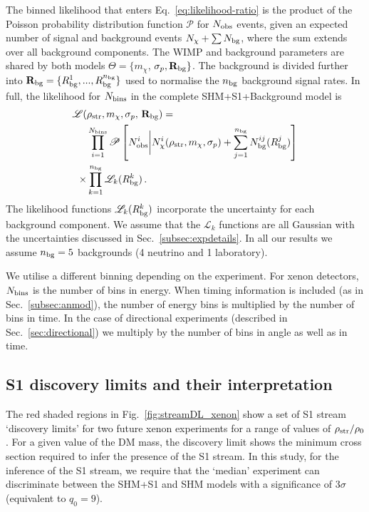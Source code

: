 \documentclass[prd,10pt,twocolumn,showpacs,nofootinbib,aps,superscriptaddress,preprintnumbers]{revtex4-1}
\begin{document}
The binned likelihood that enters Eq.~\eqref{eq:likelihood-ratio} is the product of the Poisson probability distribution function $\mathscr{P}$ for $N_{\rm obs}$ events, given an expected number of signal and background events $N_{\chi} + \sum N_{\rm bg}$, where the sum extends over all background components. The WIMP and background parameters are shared by both models $\Theta = \{m_\chi$,  $\sigma_p, \mathbf{R}_{\rm bg}\}$. The background is divided further into $\mathbf{R}_{\rm bg} = \{ R_{\rm bg}^1, ..., R_{\rm bg}^{n_{\rm bg}} \}$ used to normalise the $n_{\rm bg}$ background signal rates. In full, the likelihood for $N_{\rm bins}$ in the complete SHM+S1+Background model is
\begin{align}
\label{eq:Like}
\mathscr{L}(&\rho_{\rm str},m_\chi,\sigma_p,\,\mathbf{R}_{\rm bg} ) =\\ &\prod_{i=1}^{ N_{\rm bins}}\mathscr{P}\left[N_\textrm{obs}^i \bigg| N^i_\chi(\rho_{\rm str},m_\chi,\sigma_p) + \sum_{j=1}^{n_{\rm bg}}N^{ij}_{\rm bg}(R^j_{\rm bg}) \right]   \nonumber\\ 
 \times &\prod_{k=1}^{n_{\rm bg}}\mathscr{L}_k (R_{\rm bg}^k) \, .
\end{align}
The likelihood functions $\mathscr{L}_k(R_{\rm bg}^k)$ incorporate the uncertainty for each background component. We assume that the $\mathscr{L}_k$ functions are all Gaussian with the uncertainties discussed in Sec.~\ref{subsec:expdetails}. In all our results we assume $n_{\rm bg} = 5$ backgrounds (4 neutrino and 1 laboratory). 

We utilise a different binning depending on the experiment.  For xenon detectors, $N_{\rm bins}$ is the number of bins in energy. When timing information is included (as in Sec.~\ref{subsec:anmod}), the number of energy bins is multiplied by the number of bins in time. In the case of directional experiments (described in Sec.~\ref{sec:directional}) we multiply by the number of bins in angle as well as in time.


\subsection{S1 discovery limits and their interpretation}\label{sec:streamDLs}

The red shaded regions in Fig.~\ref{fig:streamDL_xenon} show a set of 
S1 stream `discovery limits' for two future xenon experiments
for a range of values of $\rho_{\rm{str}}/\rho_0$.
For a given value of the DM mass, the discovery limit shows the minimum cross section required to
infer the presence of the S1 stream. In this study, for the inference of the S1 stream, we require that the `median' experiment
 can discriminate between the SHM+S1 and SHM models with a significance of 3$\sigma$
(equivalent to $q_0=9$).
\end{document}
